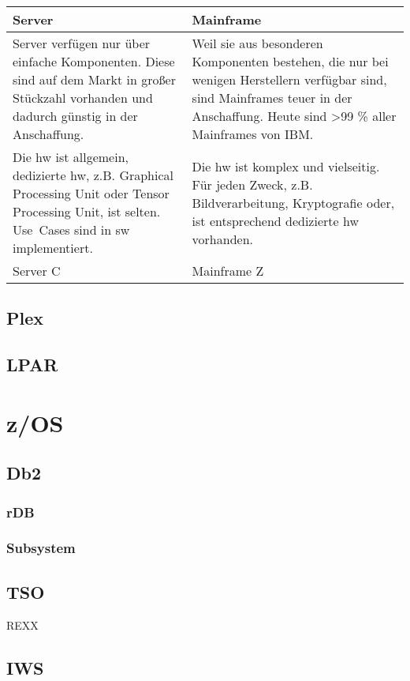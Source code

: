 \begin{table}
    \begin{tabularx}{\textwidth}{|X|X|}
        \hline
        \textbf{Server} & \textbf{Mainframe} \\
        \hline
        Server verfügen nur über einfache Komponenten. Diese sind auf dem Markt in großer Stückzahl vorhanden und dadurch günstig in der Anschaffung.
        &
        Weil sie aus besonderen Komponenten bestehen, die nur bei wenigen Herstellern verfügbar sind, sind Mainframes teuer in der Anschaffung. Heute sind >99 \% aller Mainframes von IBM.
        \\
        \hline
        Die \ac{hw} ist allgemein, dedizierte \ac{hw}, z.B. Graphical Processing Unit oder Tensor Processing Unit, ist selten. \mbox{Use Cases} sind in \ac{sw} implementiert.
        &
        Die \ac{hw} ist komplex und vielseitig. Für jeden Zweck, z.B. Bildverarbeitung, Kryptografie oder, ist entsprechend dedizierte \ac{hw} vorhanden.
        \\
        \hline
        Server C
        &
        Mainframe Z
        \\
        \hline
    \end{tabularx}
\end{table}

\subsection{Plex}

\subsection{LPAR}

\section{z/OS}

\subsection{Db2}

\subsubsection{rDB}
\subsubsection{Subsystem}

\subsection{TSO}
REXX

\subsection{IWS}